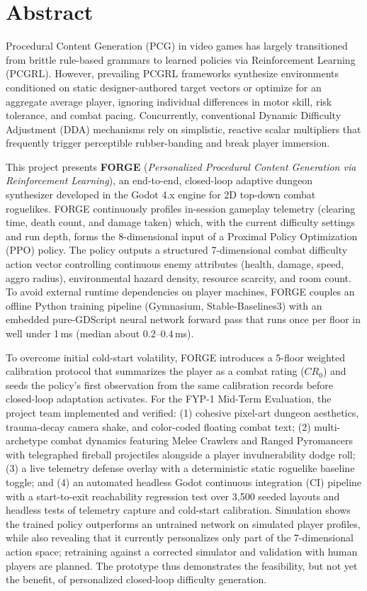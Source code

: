\chapter*{Abstract}

Procedural Content Generation (PCG) in video games has largely transitioned from brittle rule-based grammars to learned policies via Reinforcement Learning (PCGRL). However, prevailing PCGRL frameworks synthesize environments conditioned on static designer-authored target vectors or optimize for an aggregate average player, ignoring individual differences in motor skill, risk tolerance, and combat pacing. Concurrently, conventional Dynamic Difficulty Adjustment (DDA) mechanisms rely on simplistic, reactive scalar multipliers that frequently trigger perceptible rubber-banding and break player immersion.

This project presents \textbf{FORGE} (\textit{Personalized Procedural Content Generation via Reinforcement Learning}), an end-to-end, closed-loop adaptive dungeon synthesizer developed in the Godot 4.x engine for 2D top-down combat roguelikes. FORGE continuously profiles in-session gameplay telemetry (clearing time, death count, and damage taken) which, with the current difficulty settings and run depth, forms the 8-dimensional input of a Proximal Policy Optimization (PPO) policy. The policy outputs a structured 7-dimensional combat difficulty action vector controlling continuous enemy attributes (health, damage, speed, aggro radius), environmental hazard density, resource scarcity, and room count. To avoid external runtime dependencies on player machines, FORGE couples an offline Python training pipeline (Gymnasium, Stable-Baselines3) with an embedded pure-GDScript neural network forward pass that runs once per floor in well under 1\,ms (median about $0.2$--$0.4$\,ms). 

To overcome initial cold-start volatility, FORGE introduces a 5-floor weighted calibration protocol that summarizes the player as a combat rating ($CR_0$) and seeds the policy's first observation from the same calibration records before closed-loop adaptation activates. For the FYP-1 Mid-Term Evaluation, the project team implemented and verified: (1) cohesive pixel-art dungeon aesthetics, trauma-decay camera shake, and color-coded floating combat text; (2) multi-archetype combat dynamics featuring Melee Crawlers and Ranged Pyromancers with telegraphed fireball projectiles alongside a player invulnerability dodge roll; (3) a live telemetry defense overlay with a deterministic static roguelike baseline toggle; and (4) an automated headless Godot continuous integration (CI) pipeline with a start-to-exit reachability regression test over 3,500 seeded layouts and headless tests of telemetry capture and cold-start calibration. Simulation shows the trained policy outperforms an untrained network on simulated player profiles, while also revealing that it currently personalizes only part of the 7-dimensional action space; retraining against a corrected simulator and validation with human players are planned. The prototype thus demonstrates the feasibility, but not yet the benefit, of personalized closed-loop difficulty generation.

